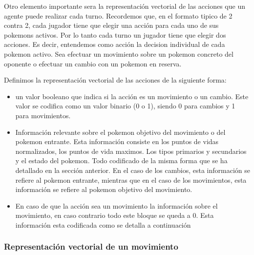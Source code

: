 \begin{itemize}
Otro elemento importante sera la representación vectorial de las acciones que un agente puede realizar cada turno. Recordemos que, en el formato tipico de 2 contra 2, cada jugador tiene que elegir una acción para cada uno de sus pokemons activos. Por lo tanto cada turno un jugador tiene que elegir dos acciones. Es decir, entendemos como acción la decision individual de cada pokemon activo. Sea efectuar un movimiento sobre un pokemon concreto del oponente o efectuar un cambio con un pokemon en reserva.

Definimos la representación vectorial de las acciones de la siguiente forma:
\begin{itemize}
    \item un valor booleano que indica si la acción es un movimiento o un cambio. Este valor se codifica como un valor binario (0 o 1), siendo 0 para cambios y 1 para movimientos.
    \item Información relevante sobre el pokemon objetivo del movimiento o del pokemon entrante. Esta información consiste en los puntos de vidas normalizados, los puntos de vida maximos. Los tipos primarios y secundarios y el estado del pokemon. Todo codificado de la misma forma que se ha detallado en la sección anterior. En el caso de los cambios, esta información se refiere al pokemon entrante, mientras que en el caso de los movimientos, esta información se refiere al pokemon objetivo del movimiento.
    \item En caso de que la acción sea un movimiento la información sobre el movimiento, en caso contrario todo este bloque se queda a 0. Esta información esta codificada como se detalla a continuación
\end{itemize}

\subsubsection{Representación vectorial de un movimiento}


\end{itemize}
